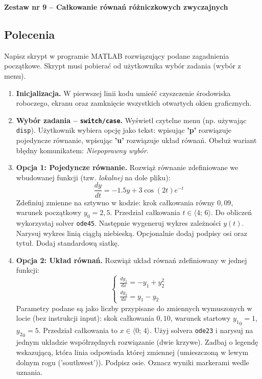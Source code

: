 \documentclass[a4paper,11pt]{article}
\begin{document}
\clearpage
\begin{center}
  {\large\bfseries Zestaw nr 9 \quad -- \quad Całkowanie równań różniczkowych zwyczajnych}
\end{center}
\hrulefill
\vspace{0.4cm}

\subsection*{Polecenia}

Napisz skrypt w programie MATLAB rozwiązujący podane zagadnienia początkowe. Skrypt musi pobierać od użytkownika wybór zadania (wybór z menu).

\begin{enumerate}[leftmargin=*, label=\textbf{\arabic*.}, itemsep=2pt]

  \item \textbf{Inicjalizacja.}
    W pierwszej linii kodu umieść czyszczenie środowiska roboczego, ekranu oraz zamknięcie wszystkich otwartych okien graficznych.

  \item \textbf{Wybór zadania -- \texttt{switch/case}.}
    Wyświetl czytelne menu (np. używając \texttt{disp}). Użytkownik wybiera opcję jako tekst: wpisując \textbf{'p'} rozwiązuje pojedyncze równanie, wpisując \textbf{'u'} rozwiązuje układ równań. Obsłuż wariant błędny komunikatem: \textit{Niepoprawny wybór}.

  \item \textbf{Opcja 1: Pojedyncze równanie.}
    Rozwiąż równanie zdefiniowane we wbudowanej funkcji (tzw. \textit{lokalnej} na dole pliku):
    \[ \frac{dy}{dt} = -1.5y + 3\cos(2t)e^{-t} \]
    Zdefiniuj zmienne na sztywno w kodzie: krok całkowania równy $0{,}09$, warunek początkowy $y_0 = 2{,}5$. Przedział całkowania $t \in \langle 4;\,6 \rangle$.
    Do obliczeń wykorzystaj solver \texttt{ode45}. Następnie wygeneruj wykres zależności $y(t)$. Narysuj wykres linią ciągłą niebieską. Opcjonalnie dodaj podpisy osi oraz tytuł. Dodaj standardową siatkę.

  \item \textbf{Opcja 2: Układ równań.}
    Rozwiąż układ równań zdefiniowany w jednej funkcji:\\[-0.5em]
    \[
    \begin{cases}
      \frac{dy_1}{dx} = -y_1 + y_2^2 \\
      \frac{dy_2}{dx} = y_1 - y_2
    \end{cases}
    \]
    Parametry podane są jako liczby przypisane do zmiennych wymuszonych w locie (bez instrukcji input): skok całkowania $0{,}10$, warunek startowy $ {y_1}_{0} = 1 $, $ {y_2}_{0} = 5 $. Przedział całkowania to $x \in \langle 0;\,4 \rangle$.
    Użyj solvera \texttt{ode23} i narysuj na jednym układzie współrzędnych rozwiązanie (dwie krzywe). Zadbaj o legendę wskazującą, która linia odpowiada której zmiennej (umieszczoną w lewym dolnym rogu ('southwest')). Podpisz osie. Oznacz wyniki markerami wedle uznania.

\end{enumerate}
\end{document}
